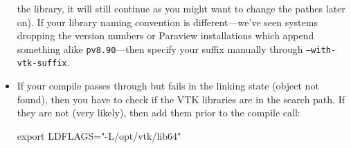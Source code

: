 \begin{itemize}
  the library, it will still continue as you might want to change the pathes
  later on). If your library naming convention is different---we've seen
  systems dropping the version numbers or Paraview installations which append
  something alike \texttt{pv8.90}---then specify your suffix manually through
  \texttt{--with-vtk-suffix}.
  \item If your compile passes through but fails in the linking state (object
  not found), then you have to check if the VTK libraries are in the search
  path. If they are not (very likely), then add them prior to the compile call:
\begin{code}
export LDFLAGS="-L/opt/vtk/lib64"
\end{code}
\end{itemize}




    


  
  
  
  

